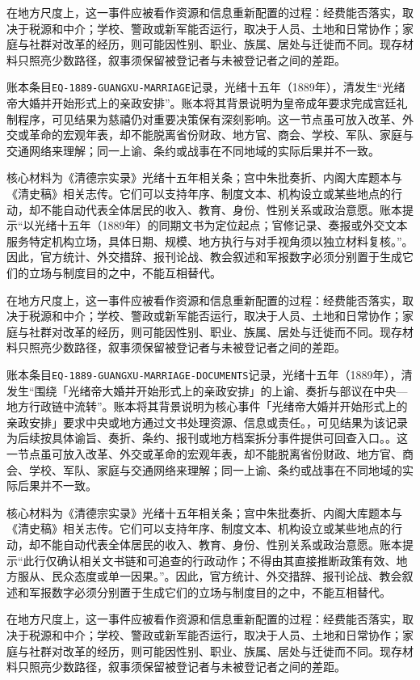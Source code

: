 在地方尺度上，这一事件应被看作资源和信息重新配置的过程：经费能否落实，取决于税源和中介；学校、警政或新军能否运行，取决于人员、土地和日常协作；家庭与社群对改革的经历，则可能因性别、职业、族属、居处与迁徙而不同。现存材料只照亮少数路径，叙事须保留被登记者与未被登记者之间的差距。

账本条目\texttt{EQ-1889-GUANGXU-MARRIAGE}记录，光绪十五年（1889年），清发生“光绪帝大婚并开始形式上的亲政安排”。账本将其背景说明为皇帝成年要求完成宫廷礼制程序，可见结果为慈禧仍对重要决策保有深刻影响。这一节点虽可放入改革、外交或革命的宏观年表，却不能脱离省份财政、地方官、商会、学校、军队、家庭与交通网络来理解；同一上谕、条约或战事在不同地域的实际后果并不一致。

核心材料为《清德宗实录》光绪十五年相关条；宫中朱批奏折、内阁大库题本与《清史稿》相关志传。它们可以支持年序、制度文本、机构设立或某些地点的行动，却不能自动代表全体居民的收入、教育、身份、性别关系或政治意愿。账本提示“以光绪十五年（1889年）的同期文书为定位起点；官修记录、奏报或外交文本服务特定机构立场，具体日期、规模、地方执行与对手视角须以独立材料复核。”。因此，官方统计、外交措辞、报刊论战、教会叙述和军报数字必须分别置于生成它们的立场与制度目的之中，不能互相替代。

在地方尺度上，这一事件应被看作资源和信息重新配置的过程：经费能否落实，取决于税源和中介；学校、警政或新军能否运行，取决于人员、土地和日常协作；家庭与社群对改革的经历，则可能因性别、职业、族属、居处与迁徙而不同。现存材料只照亮少数路径，叙事须保留被登记者与未被登记者之间的差距。

账本条目\texttt{EQ-1889-GUANGXU-MARRIAGE-DOCUMENTS}记录，光绪十五年（1889年），清发生“围绕「光绪帝大婚并开始形式上的亲政安排」的上谕、奏折与部议在中央—地方行政链中流转”。账本将其背景说明为核心事件「光绪帝大婚并开始形式上的亲政安排」要求中央或地方通过文书处理资源、信息或责任。，可见结果为该记录为后续按具体谕旨、奏折、条约、报刊或地方档案拆分事件提供可回查入口。。这一节点虽可放入改革、外交或革命的宏观年表，却不能脱离省份财政、地方官、商会、学校、军队、家庭与交通网络来理解；同一上谕、条约或战事在不同地域的实际后果并不一致。

核心材料为《清德宗实录》光绪十五年相关条；宫中朱批奏折、内阁大库题本与《清史稿》相关志传。它们可以支持年序、制度文本、机构设立或某些地点的行动，却不能自动代表全体居民的收入、教育、身份、性别关系或政治意愿。账本提示“此行仅确认相关文书链和可追查的行政动作；不得由其直接推断政策有效、地方服从、民众态度或单一因果。”。因此，官方统计、外交措辞、报刊论战、教会叙述和军报数字必须分别置于生成它们的立场与制度目的之中，不能互相替代。

在地方尺度上，这一事件应被看作资源和信息重新配置的过程：经费能否落实，取决于税源和中介；学校、警政或新军能否运行，取决于人员、土地和日常协作；家庭与社群对改革的经历，则可能因性别、职业、族属、居处与迁徙而不同。现存材料只照亮少数路径，叙事须保留被登记者与未被登记者之间的差距。

